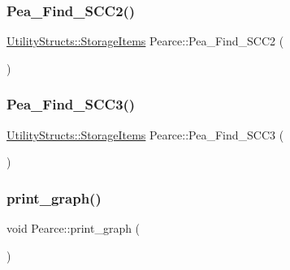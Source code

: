 \subsubsection{\texorpdfstring{Pea\+\_\+\+Find\+\_\+\+S\+C\+C2()}{Pea\_Find\_SCC2()}}
{\footnotesize\ttfamily \hyperlink{struct_utility_structs_1_1_storage_items}{Utility\+Structs\+::\+Storage\+Items} Pearce\+::\+Pea\+\_\+\+Find\+\_\+\+S\+C\+C2 (\begin{DoxyParamCaption}{ }\end{DoxyParamCaption})}

\mbox{\label{class_pearce_a9d49726ab058f24cc943135458edb4f9_a9d49726ab058f24cc943135458edb4f9}} 
\subsubsection{\texorpdfstring{Pea\+\_\+\+Find\+\_\+\+S\+C\+C3()}{Pea\_Find\_SCC3()}}
{\footnotesize\ttfamily \hyperlink{struct_utility_structs_1_1_storage_items}{Utility\+Structs\+::\+Storage\+Items} Pearce\+::\+Pea\+\_\+\+Find\+\_\+\+S\+C\+C3 (\begin{DoxyParamCaption}{ }\end{DoxyParamCaption})}

\mbox{\label{class_pearce_a96ed7e50d992838177699b6133464554_a96ed7e50d992838177699b6133464554}} 
\subsubsection{\texorpdfstring{print\+\_\+graph()}{print\_graph()}}
{\footnotesize\ttfamily void Pearce\+::print\+\_\+graph (\begin{DoxyParamCaption}{ }\end{DoxyParamCaption})}

\mbox{\label{class_pearce_aaa906779c670a16948c00a9c031e6986_aaa906779c670a16948c00a9c031e6986}} 
